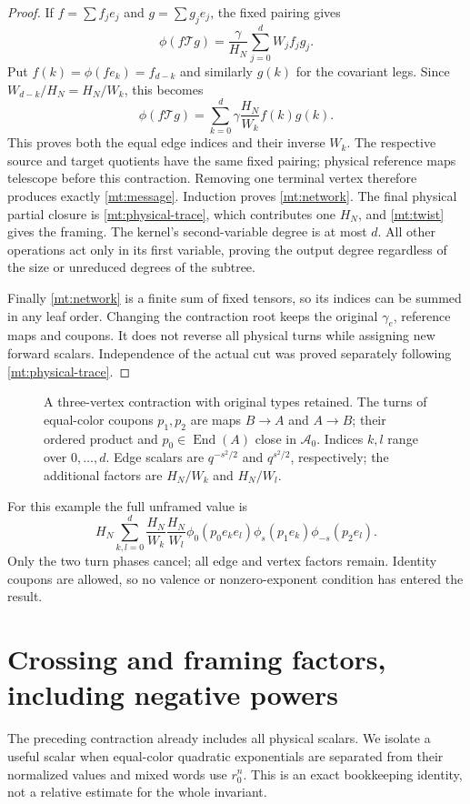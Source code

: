 \documentclass[11pt]{article}
\numberwithin{equation}{section}
\theoremstyle{definition}\newtheorem{definition}[theorem]{Definition}
\theoremstyle{remark}\newtheorem{remark}[theorem]{Remark}
\newcommand{\End}{\operatorname{End}}
\newcommand{\Turn}{\mathscr T}
\newcommand{\Acal}{\mathcal A}
\begin{document}
\begin{proof}
If $f=\sum f_je_j$ and $g=\sum g_je_j$, the fixed pairing gives
\[
 \phi(f\Turn g)=\frac{\gamma}{H_N}\sum_{j=0}^dW_j f_jg_j.
\]
Put $f(k)=\phi(f e_k)=f_{d-k}$ and similarly $g(k)$ for the
covariant legs. Since $W_{d-k}/H_N=H_N/W_k$, this becomes
\begin{equation}\label{mt:edge-contraction}
 \phi(f\Turn g)=\sum_{k=0}^d
        \gamma\frac{H_N}{W_k}f(k)g(k).
\end{equation}
This proves both the equal edge indices and their inverse $W_k$.
The respective source and target quotients have the same fixed
pairing; physical reference maps telescope before this contraction.
Removing one terminal vertex therefore produces exactly
\eqref{mt:message}. Induction proves \eqref{mt:network}.
The final physical partial closure is \eqref{mt:physical-trace},
which contributes one $H_N$, and \eqref{mt:twist} gives the framing.
The kernel's second-variable degree is at most $d$. All other
operations act only in its first variable, proving the output
degree regardless of the size or unreduced degrees of the subtree.

Finally \eqref{mt:network} is a finite sum of fixed tensors, so its
indices can be summed in any leaf order. Changing the contraction
root keeps the original $\gamma_e$, reference maps and coupons. It does
not reverse all physical turns while assigning new forward scalars.
Independence of the actual cut was proved separately following
\eqref{mt:physical-trace}.
\end{proof}

\begin{figure}[ht]
\centering
\caption{A three-vertex contraction with original types retained.
The turns of equal-color coupons $p_1,p_2$ are maps $B\to A$ and
$A\to B$; their ordered product and $p_0\in\End(A)$ close in
$\Acal_0$. Indices $k,l$ range over $0,\ldots,d$. Edge scalars
are $q^{-s^2/2}$ and $q^{s^2/2}$, respectively; the additional
factors are $H_N/W_k$ and $H_N/W_l$.}
\label{mt:tree-figure}
\end{figure}
For this example the full unframed value is
\[
 H_N\sum_{k,l=0}^d\frac{H_N}{W_k}\frac{H_N}{W_l}
       \phi_0(p_0e_ke_l)\phi_s(p_1e_k)\phi_{-s}(p_2e_l).
\]
Only the two turn phases cancel; all edge and vertex factors remain.
Identity coupons are allowed, so no valence or nonzero-exponent
condition has entered the result.

\section{Crossing and framing factors, including negative powers}
The preceding contraction already includes all physical scalars.
We isolate a useful scalar when equal-color quadratic exponentials are separated
from their normalized values and mixed words use $r_0^n$. This is
an exact bookkeeping identity, not a relative estimate for the
whole invariant.
\end{document}
